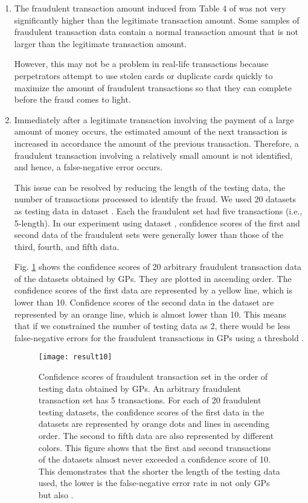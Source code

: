 \documentclass[final,authoryear,5p,times,twocolumn]{elsarticle}
\begin{document}
\begin{enumerate}
\item The fraudulent transaction amount induced from Table 4 of \citet{ref3} was not very significantly higher than the legitimate transaction amount. Some samples of fraudulent transaction data contain a normal transaction amount that is not larger than the legitimate transaction amount.

However, this may not be a problem in real-life transactions because perpetrators attempt to use stolen cards or duplicate cards quickly to maximize the amount of fraudulent transactions so that they can complete before the fraud comes to light.

\item Immediately after a legitimate transaction involving the payment of a large amount of money occurs, the estimated amount of the next transaction is increased in accordance the amount of the previous transaction. Therefore, a fraudulent transaction involving a relatively small amount is not identified, and hence, a false-negative error occurs.

This issue can be resolved by reducing the length of the testing data, the number of transactions processed to identify the fraud. We used 20  datasets as testing data in dataset . Each the fraudulent set had five transactions (i.e., 5-length). In our experiment using dataset , confidence scores of the first and second data of the fraudulent  sets were generally lower than those of the third, fourth, and fifth data.

Fig. \ref{fig:result10} shows the confidence scores of 20 arbitrary fraudulent transaction data of the  datasets obtained by GPs. They are plotted in ascending order. The confidence scores of the first  data are represented by a yellow line, which is lower than 10. Confidence scores of the second data in the  dataset are represented by an orange line, which is almost lower than 10. This means that if we constrained the number of testing data as 2, there would be less false-negative errors for the fraudulent transactions in GPs using a threshold .

\begin{figure}[h!]
\begin{center}
\texttt{[image: result10]}
\caption{Confidence scores of fraudulent transaction set  in the order of testing data obtained by GPs. An arbitrary fraudulent transaction set  has 5 transactions. For each of 20 fraudulent  testing datasets, the confidence scores of the first data in the  datasets are represented by orange dots and lines in ascending order. The second to fifth data are also represented by different colors. This figure shows that the first and second transactions of the  datasets almost never exceeded a confidence score of 10. This demonstrates that the shorter the length of the testing data used, the lower is the false-negative error rate in not only GPs but also .}
\label{fig:result10}
\end{center}
\end{figure}


\end{enumerate}
\end{document}
